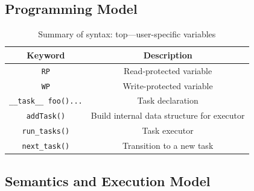 \subsection{Programming Model}
\label{sec:overview_programming_model}

\begin{table}
	\centering
	\footnotesize
	\begin{tabular}{|c|c|}
		\hline
		Keyword & Description\\
		\hline\hline
		\texttt{RP} & Read-protected variable\\
		\texttt{WP} & Write-protected variable\\
		\texttt{\_\_task\_\_ foo(){...}} & Task declaration\\
		\texttt{addTask()} & Build internal data structure for executor \\
		\texttt{run\_tasks()} & Task executor \\ %
		\texttt{next\_task()} & Transition to a new task\\
		\hline
	\end{tabular}
\caption{Summary of \sys syntax: top---user-specific variables}
\label{tab:viper_syntax}
\end{table}

\subsection{Semantics and Execution Model}
\label{sec:overview_semantics}

